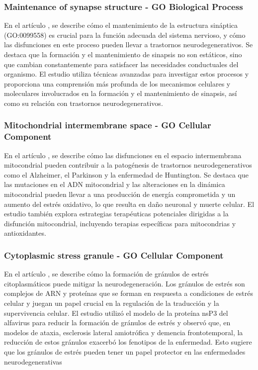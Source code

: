 \subsubsection{Maintenance of synapse structure - GO Biological Process}
En el artículo \cite{Batool2019}, se describe cómo el mantenimiento de la estructura sináptica (GO:0099558) es crucial para la función adecuada del sistema nervioso, y cómo las disfunciones en este proceso pueden llevar a trastornos neurodegenerativos. Se destaca que la formación y el mantenimiento de sinapsis no son estáticos, sino que cambian constantemente para satisfacer las necesidades conductuales del organismo. El estudio utiliza técnicas avanzadas para investigar estos procesos y proporciona una comprensión más profunda de los mecanismos celulares y moleculares involucrados en la formación y el mantenimiento de sinapsis, así como su relación con trastornos neurodegenerativos.

\subsubsection{Mitochondrial intermembrane space - GO Cellular Component}

En el artículo \cite{Kathiresan2024}, se describe cómo las disfunciones en el espacio intermembrana mitocondrial pueden contribuir a la patogénesis de trastornos neurodegenerativos como el Alzheimer, el Parkinson y la enfermedad de Huntington. Se destaca que las mutaciones en el ADN mitocondrial y las alteraciones en la dinámica mitocondrial pueden llevar a una producción de energía comprometida y un aumento del estrés oxidativo, lo que resulta en daño neuronal y muerte celular. El estudio también explora estrategias terapéuticas potenciales dirigidas a la disfunción mitocondrial, incluyendo terapias específicas para mitocondrias y antioxidantes.

\subsubsection{Cytoplasmic stress granule - GO Cellular Component}

En el artículo \cite{10.1093/nar/gkae655}, se describe cómo la formación de gránulos de estrés citoplasmáticos puede mitigar la neurodegeneración. Los gránulos de estrés son complejos de ARN y proteínas que se forman en respuesta a condiciones de estrés celular y juegan un papel crucial en la regulación de la traducción y la supervivencia celular. El estudio utilizó el modelo de la proteína nsP3 del alfavirus para reducir la formación de gránulos de estrés y observó que, en modelos de ataxia, esclerosis lateral amiotrófica y demencia frontotemporal, la reducción de estos gránulos exacerbó los fenotipos de la enfermedad. Esto sugiere que los gránulos de estrés pueden tener un papel protector en las enfermedades neurodegenerativas


